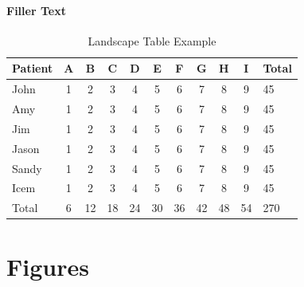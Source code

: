 \paragraph{Filler Text} \lipsum[1-2]
\thispagestyle{lscapedplain}
\begin{landscape}
\begin{table}
\caption{Landscape Table Example}
\label{tab:two}
\begin{center}
\begin{tabular}{lcccccccccl}
\toprule
Patient & A & B & C & D & E & F & G & H &I & Total \\
\midrule
John & 1 & 2 & 3 & 4 & 5 & 6 & 7 & 8 & 9 & 45 \\
Amy & 1 & 2 & 3 & 4 & 5 & 6 & 7 & 8 & 9 & 45 \\
Jim & 1 & 2 & 3 & 4 & 5 & 6 & 7 & 8 & 9 & 45 \\
Jason & 1 & 2 & 3 & 4 & 5 & 6 & 7 & 8 & 9 & 45 \\
Sandy & 1 & 2 & 3 & 4 & 5 & 6 & 7 & 8 & 9 & 45 \\
Icem & 1 & 2 & 3 & 4 & 5 & 6 & 7 & 8 & 9 & 45 \\
\midrule
Total & 6 & 12 & 18 & 24 & 30 & 36 & 42 & 48 & 54 & 270\\
\bottomrule
\end{tabular}
\end{center}
\end{table}
\end{landscape}
\restoregeometry
\pagestyle{fancy}
\thispagestyle{fancy}


\section{Figures}

